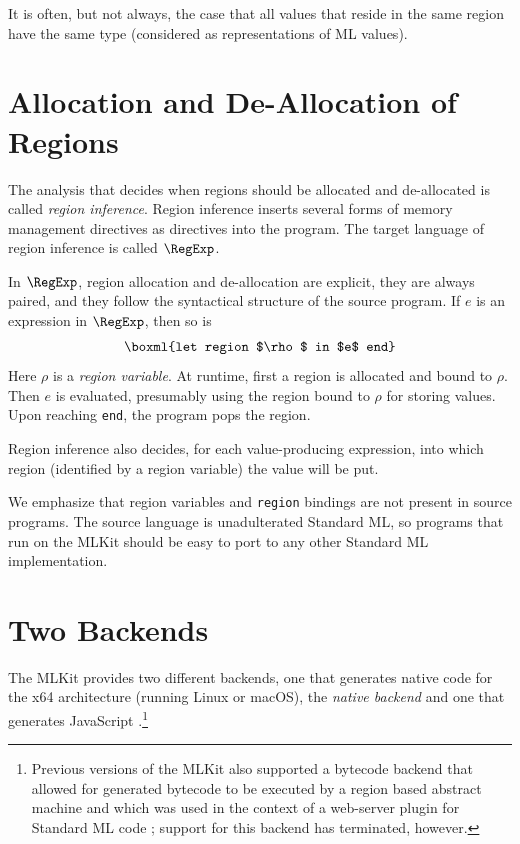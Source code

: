 \documentclass[12pt]{book}
\begin{document}
It is often, but not always, the case that all values that reside in
the same region have the same type (considered as representations of
ML values).

\section{Allocation and De-Allocation of Regions}
\label{aldeal.sec}
The analysis that decides when regions should be allocated and
de-allocated is called {\em region inference}. Region inference
inserts several forms of memory management directives as directives
into the program.  The target language of region inference is called
%
$\RegExp$.

In $\RegExp$, region allocation and de-allocation are explicit, they
are always paired, and they follow the syntactical structure of the
source program.  If $e$ is an expression in $\RegExp$, then so is
%
$$\boxml{let region $\rho$ in $e$ end}$$
Here $\rho$ is a
%
{\em region variable}. At runtime, first a region is allocated and
bound to $\rho$. Then $e$ is evaluated, presumably using the region
bound to $\rho$ for storing values. Upon reaching {\tt end}, the
program pops the region.

Region inference also decides, for each value-producing expression,
into which region (identified by a region variable) the value will be
put.

We emphasize that region variables and {\tt region} bindings are
not present in source programs. The source language is unadulterated
Standard ML, so programs that run on the MLKit should be easy to port to
any other Standard ML implementation.


\section{Two Backends}
%
%
%
The MLKit provides two different backends, one that generates native
code for the x64 architecture (running Linux or macOS), the {\em
  native backend\/} and one that generates JavaScript
\cite{10.1145/2093328.2093336}.\footnote{Previous versions of the
  MLKit also supported a bytecode backend that allowed for generated
  bytecode to be executed by a region based abstract machine
  \cite{kam02} and which was used in the context of a web-server
  plugin for Standard ML code \cite{eh03,smlserver07}; support for this backend has terminated, however.}
\end{document}
